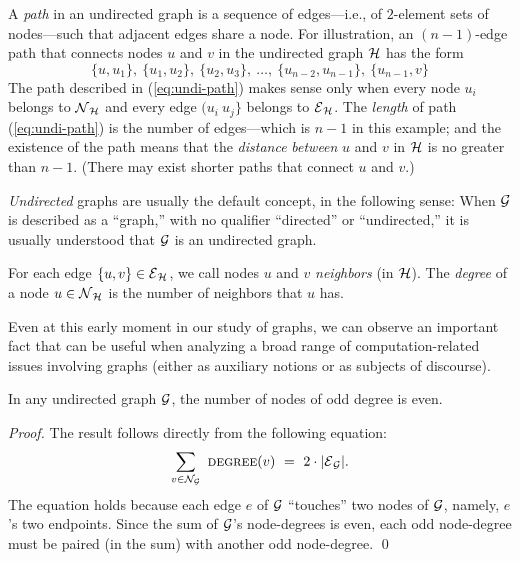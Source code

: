 A {\it path} in an undirected graph   is a sequence of
edges---i.e., of $2$-element sets of nodes---such that adjacent edges
share a node.  For illustration, an $(n-1)$-edge path that connects
nodes $u$ and $v$ in the undirected graph $\mbox{$\cal H$}$ has the form
\begin{equation}
\label{eq:undi-path}
\{u, u_1\}, \ \{u_1, u_2\}, \ \{u_2, u_3\}, \ \ldots, \ \{u_{n-2},
u_{n-1}\}, \ \{u_{n-1}, v\}
\end{equation}
The path described in (\ref{eq:undi-path}) makes sense only when every
node $u_i$ belongs to $\mbox{$\cal N$}_{\mbox{{\scriptsize $\cal H$}}}$ and every edge $(u_i \ u_j\}$ belongs
to $\mbox{$\cal E$}_{\mbox{{\scriptsize $\cal H$}}}$.  The {\it length} of path (\ref{eq:undi-path}) is the
number of edges---which is $n-1$ in this example; and the existence of
the path means that the {\it distance} 
 {\it between} $u$ and $v$ in $\mbox{$\cal H$}$ is no
greater than $n-1$.  (There may exist shorter paths that connect $u$
and $v$.)

\medskip

{\em Undirected} graphs are usually the default concept, in the
following sense: When $\mbox{$\cal G$}$ is described as a ``graph,'' with no
qualifier ``directed'' or ``undirected,'' it is usually understood
that $\mbox{$\cal G$}$ is an undirected graph.

\medskip

For each edge $\{u,v\} \in \mbox{$\cal E$}_{\mbox{{\scriptsize $\cal H$}}}$, we call nodes $u$ and $v$ {\it
  neighbors} (in $\mbox{$\cal H$}$).
The {\it degree}
of a node $u \in \mbox{$\cal N$}_{\mbox{{\scriptsize $\cal H$}}}$ is the number of neighbors that $u$ has.

Even at this early moment in our study of graphs, we can observe an
important fact that can be useful when analyzing a broad range of
computation-related issues involving graphs (either as auxiliary
notions or as subjects of discourse).

\begin{prop}
\label{thm:even-num-odd-degrees}
In any undirected graph $\mbox{$\cal G$}$, the number of nodes of odd degree is
even.
\end{prop}

\begin{proof}
The result follows directly from the following equation:
\[ \sum_{v \in {\cal N}_{\cal G}} \ \mbox{\sc degree}(v) \ = \ 2 \cdot
|\e_{\cal G}|.
\]
The equation holds because each edge $e$ of $\mbox{$\cal G$}$ ``touches'' two nodes
of $\mbox{$\cal G$}$, namely, $e$'s two endpoints.  Since the sum of $\mbox{$\cal G$}$'s
node-degrees is even, each odd node-degree must be paired (in the sum)
with another odd node-degree.  \qed
\end{proof}

